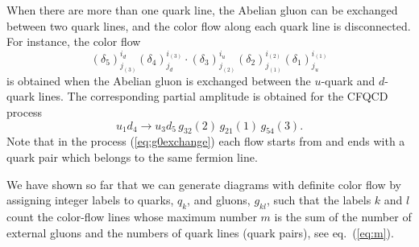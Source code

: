 When there are more than one quark line, the Abelian gluon can be
exchanged between two quark lines, and the color flow along each quark
line is disconnected. For instance, the color flow
\begin{equation}
 (\delta_5)^{i_d}_{j_{(3)}}(\delta_4)^{i_{(3)}}_{j_d}\cdot
  (\delta_3)^{i_u}_{j_{(2)}}(\delta_2)^{i_{(2)}}_{j_{(1)}}(\delta_1)^{i_{(1)}}_{j_u}
\end{equation}
is obtained when the Abelian gluon is exchanged between the $u$-quark and
$d$-quark lines. The corresponding partial amplitude is obtained for the
CFQCD process
  \begin{equation}
u_1d_4\rightarrow u_3d_5\,g_{32}(2)\,g_{21}(1)\,g_{54}(3).
\label{eq:g0exchange}
  \end{equation}
Note that in the process (\ref{eq:g0exchange}) each flow starts from and ends
with a quark pair which belongs to the same fermion line.

We have shown so far that we can generate diagrams with definite
color flow by assigning integer labels to quarks, $q_k$, and gluons, $g_{kl}$, such that the labels $k$ and $l$ count the color-flow lines
whose maximum number $m$ is the sum of the number of external gluons and
the numbers of quark lines (quark pairs), see eq.~(\ref{eq:m}).

